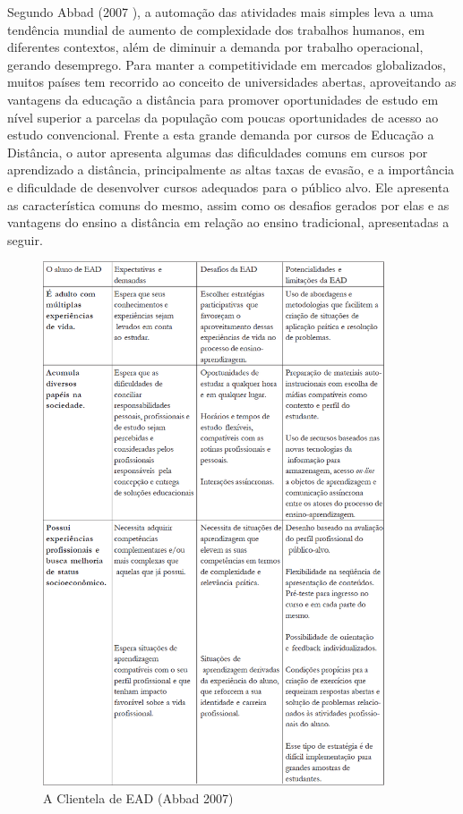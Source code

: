   Segundo Abbad (2007 \cite{Abbad_2007}), a automação das atividades mais simples leva a uma tendência mundial de aumento de complexidade dos trabalhos humanos, em diferentes contextos, além de diminuir a demanda por trabalho operacional, gerando desemprego. 
  Para manter a competitividade em mercados globalizados, muitos países tem recorrido ao conceito de universidades abertas, aproveitando as vantagens da educação a distância para promover oportunidades de estudo em nível superior a parcelas da população com poucas oportunidades de acesso ao estudo convencional. Frente a esta grande demanda por cursos de Educação a Distância, o autor apresenta algumas das dificuldades comuns em cursos por aprendizado a distância, principalmente as altas taxas de evasão, e a importância e dificuldade de desenvolver cursos adequados para o público alvo.
  Ele  apresenta  as característica comuns do mesmo, assim como os desafios gerados por elas e as vantagens do ensino a distância em relação ao ensino tradicional, apresentadas a seguir.
  
\begin{figure}
            \begin{center}
                \includegraphics[width=0.9\textwidth]{Tabela_EAD_1_Abbad_2007.png}
            \end{center}
            \caption{A Clientela de EAD (Abbad 2007\cite{Abbad_2007})}
            \label{fig:Clientella_EAD_1}
\end{figure}

